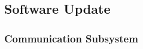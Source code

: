 \subsection{Software Update}
\label{sec:software_progress}

\subsubsection{Communication Subsystem}
\label{sec:progress_comm_sys}


